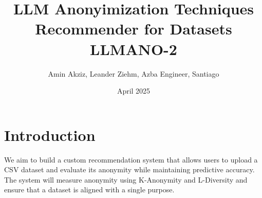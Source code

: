 \documentclass{article}
\title{LLM Anonyimization Techniques Recommender for Datasets LLMANO-2}
\author{Amin Akziz, Leander Ziehm, Azba Engineer, Santiago }
\date{April 2025}
\begin{document}
\maketitle

\section{Introduction}
We aim to build a custom recommendation system that allows users to upload a CSV dataset and evaluate its anonymity while maintaining predictive accuracy. The system will measure anonymity using K-Anonymity and L-Diversity and ensure that a dataset is aligned with a single purpose.
\section{}
\end{document}

